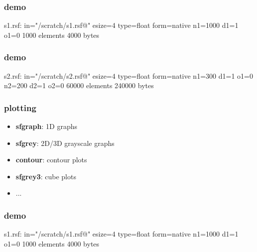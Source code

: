 \begin{frame}[fragile] \frametitle{demo}

  
  \vfill
  
\tiny
\begin{semiverbatim}
s1.rsf:
    in="/scratch/s1.rsf@"
    esize=4 type=float form=native
    n1=1000        d1=1           o1=0
        1000 elements 4000 bytes
\end{semiverbatim}
\large

\end{frame}
\cwpnote{}

\begin{frame}[fragile] \frametitle{demo}

  
  \vfill
  
\tiny
\begin{semiverbatim}
s2.rsf:
    in="/scratch/s2.rsf@"
    esize=4 type=float form=native
    n1=300         d1=1           o1=0
    n2=200         d2=1           o2=0
        60000 elements 240000 bytes
\end{semiverbatim}
\large

\end{frame}
\cwpnote{}

\begin{frame} \frametitle{plotting}

\begin{itemize}
   \item {\bf sfgraph}: 1D graphs
   \item {\bf sfgrey}: 2D/3D grayscale graphs
   \item {\bf contour}: contour plots
   \item {\bf sfgrey3}: cube plots
   \item ...
\end{itemize}

\end{frame}
\cwpnote{}

\begin{frame}[fragile] \frametitle{demo}


\tiny
\begin{semiverbatim}
s1.rsf:
    in="/scratch/s1.rsf@"
    esize=4 type=float form=native
    n1=1000        d1=1           o1=0
        1000 elements 4000 bytes
\end{semiverbatim}
\large

  \vfill
  

\end{frame}
\cwpnote{}

